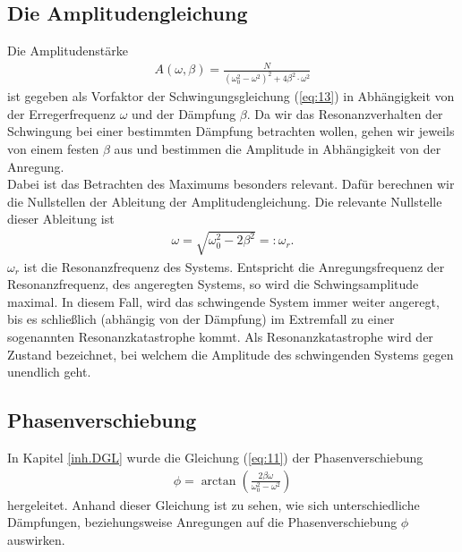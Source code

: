 \subsection{Die Amplitudengleichung}
\label{ampl}
Die Amplitudenstärke
\begin{align}
\label{eq:14}
A(\omega,\beta)=\frac{N}{(\omega_0^2-\omega^2)^2+4\beta^2\cdot\omega^2}
\end{align}
ist gegeben als Vorfaktor der Schwingungsgleichung (\ref{eq:13}) in Abhängigkeit von der Erregerfrequenz $\omega$ und der Dämpfung $\beta$.
Da wir das Resonanzverhalten der Schwingung bei einer bestimmten Dämpfung betrachten wollen, gehen wir jeweils von einem festen $\beta$ aus 
und bestimmen die Amplitude in Abhängigkeit von der Anregung.\\
Dabei ist das Betrachten des Maximums besonders relevant. Dafür berechnen wir die Nullstellen der Ableitung der 
Amplitudengleichung. Die relevante Nullstelle dieser Ableitung ist
\begin{align}
\label{eq:16}
\omega=\sqrt{\omega_0^2-2\beta^2}=:\omega_r.
\end{align}
$\omega_r$ ist die Resonanzfrequenz des Systems. Entspricht die Anregungsfrequenz der Resonanzfrequenz, des angeregten 
Systems, so wird die Schwingsamplitude maximal. In diesem Fall, wird das schwingende System immer weiter angeregt, 
bis es schließlich (abhängig von der Dämpfung) im Extremfall zu einer sogenannten Resonanzkatastrophe
kommt. Als Resonanzkatastrophe wird der Zustand bezeichnet, bei welchem die Amplitude des schwingenden Systems gegen 
unendlich geht. 

\subsection{Phasenverschiebung}
In Kapitel \ref{inh.DGL} wurde die Gleichung (\ref{eq:11}) der Phasenverschiebung
\begin{align}
\phi=\arctan\left(\frac{2\beta\omega}{\omega_0^2-\omega^2}\right) \nonumber
\end{align}
hergeleitet.
Anhand dieser Gleichung ist zu sehen, wie sich unterschiedliche Dämpfungen, beziehungsweise Anregungen auf die 
Phasenverschiebung $\phi$ auswirken.